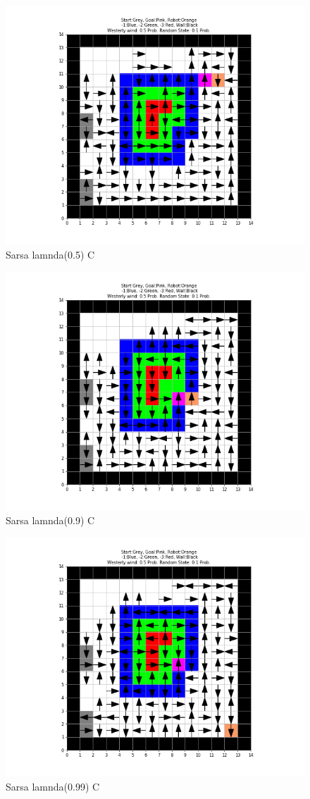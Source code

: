 \documentclass[12pt, letterpaper, twoside]{report}
\begin{document}
  \begin{figure}[b]
    \includegraphics[width=\linewidth]{Sarsa__Problem_B_lambda_05.png}
    \caption{Sarsa lamnda(0.5) C}
  \end{figure}
  \newpage
  \centering
  \begin{figure}[b]
    \includegraphics[width=\linewidth]{Sarsa_Problem_C_lambda_09.png}
    \caption{Sarsa lamnda(0.9) C}
  \end{figure}
  \begin{figure}[b]
    \includegraphics[width=\linewidth]{Sarsa_Problem_C_lambda_099.png}
    \caption{Sarsa lamnda(0.99) C}
  \end{figure}
  \label{fig:Softamx}
\end{document}
